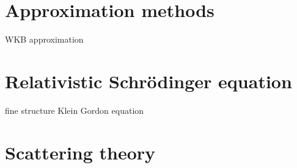 \documentclass{../../large}
\begin{document}
\section{Approximation methods}
WKB approximation

\section{Relativistic Schr\"odinger equation}
fine structure
Klein Gordon equation

\section{Scattering theory}
\end{document}
